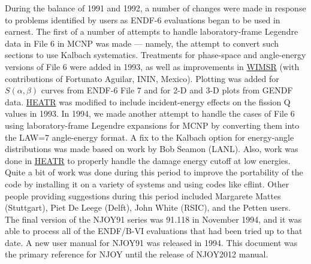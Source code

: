 During the balance of 1991 and 1992, a number of changes were made
in response to problems identified by users as ENDF-6 evaluations
began to be used in earnest.  The first of a number of attempts to
handle laboratory-frame Legendre data in File 6 in MCNP was
made --- namely, the attempt to convert such sections to use Kalbach
systematics.  Treatments for phase-space and angle-energy versions
of File 6 were added in 1993, as well as improvements in
\hyperlink{sWIMSRhy}{WIMSR} (with contributions of
Fortunato Aguilar, ININ, Mexico).  Plotting was added for
$S(\alpha,\beta)$ curves from ENDF-6 File 7 and for 2-D
and 3-D plots from GENDF data.  \hyperlink{sHEATRhy}{HEATR}
was modified to include incident-energy effects on the fission Q values
in 1993.  In 1994, we made another attempt to handle the cases of
File 6 using laboratory-frame Legendre expansions for MCNP by
converting them into the LAW=7 angle-energy format.  A fix to
the Kalbach option for energy-angle distributions was made based
on work by Bob Seamon (LANL).  Also, work was
done in \hyperlink{sHEATRhy}{HEATR} to properly
handle the damage energy  cutoff at low
energies.  Quite a bit of work was done during this period to
improve the portability of the code by installing it on a variety
of systems and using codes like cflint.  Other people providing
suggestions during this period included Margarete Mattes
(Stuttgart), Piet De Leege (Delft), John White
 (RSIC), and the Petten users.  The final version of
the NJOY91 series was 91.118 in November 1994, and it was
able to process all of the ENDF/B-VI evaluations that had been
tried up to that date.  A new user manual for NJOY91\cite{NJOY91}
was released in 1994.  This document was the
primary reference for NJOY until the release of
NJOY2012 manual\cite{NJ12}.

